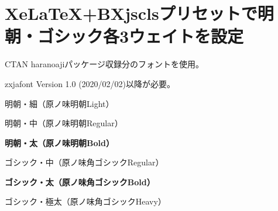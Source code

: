\documentclass[xelatex,ja=standard,jafont=haranoaji]{bxjsarticle}
\begin{document}
\section{Xe\LaTeX +BXjsclsプリセットで明朝・ゴシック各3ウェイトを設定}

CTAN haranoajiパッケージ収録分のフォントを使用。

zxjafont Version 1.0 (2020/02/02)以降が必要。

\vspace{\baselineskip}

\rmfamily
\mcfamily
\ltseries
明朝・細（原ノ味明朝Light）

\mdseries
明朝・中（原ノ味明朝Regular）

\bfseries
明朝・太（原ノ味明朝Bold）

\sffamily
\gtfamily
\mdseries
ゴシック・中（原ノ味角ゴシックRegular）

\bfseries
ゴシック・太（原ノ味角ゴシックBold）

\ebseries
ゴシック・極太（原ノ味角ゴシックHeavy）
\end{document}
